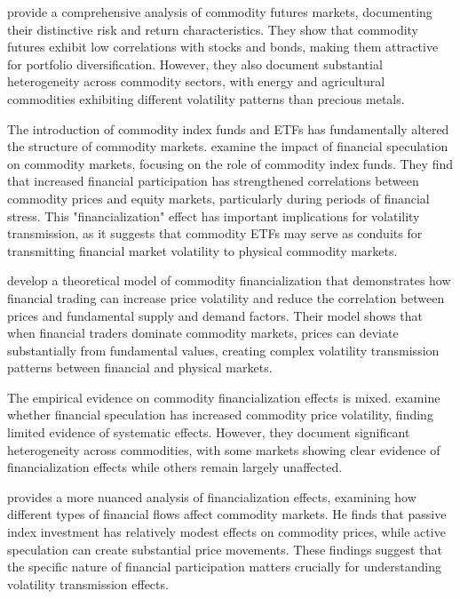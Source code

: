 \citet{gorton2006facts} provide a comprehensive analysis of commodity futures markets, documenting their distinctive risk and return characteristics. They show that commodity futures exhibit low correlations with stocks and bonds, making them attractive for portfolio diversification. However, they also document substantial heterogeneity across commodity sectors, with energy and agricultural commodities exhibiting different volatility patterns than precious metals.

The introduction of commodity index funds and ETFs has fundamentally altered the structure of commodity markets. \citet{buyuksahin2014speculation} examine the impact of financial speculation on commodity markets, focusing on the role of commodity index funds. They find that increased financial participation has strengthened correlations between commodity prices and equity markets, particularly during periods of financial stress. This "financialization" effect has important implications for volatility transmission, as it suggests that commodity ETFs may serve as conduits for transmitting financial market volatility to physical commodity markets.

\citet{basak2016model} develop a theoretical model of commodity financialization that demonstrates how financial trading can increase price volatility and reduce the correlation between prices and fundamental supply and demand factors. Their model shows that when financial traders dominate commodity markets, prices can deviate substantially from fundamental values, creating complex volatility transmission patterns between financial and physical markets.

The empirical evidence on commodity financialization effects is mixed. \citet{buyuksahin2010fundamentals} examine whether financial speculation has increased commodity price volatility, finding limited evidence of systematic effects. However, they document significant heterogeneity across commodities, with some markets showing clear evidence of financialization effects while others remain largely unaffected.

\citet{singleton2014investor} provides a more nuanced analysis of financialization effects, examining how different types of financial flows affect commodity markets. He finds that passive index investment has relatively modest effects on commodity prices, while active speculation can create substantial price movements. These findings suggest that the specific nature of financial participation matters crucially for understanding volatility transmission effects.

